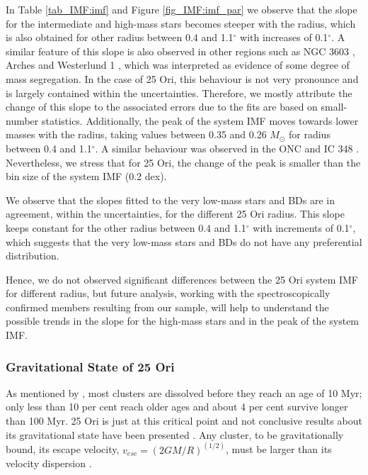 \documentclass[12pt]{article}
\begin{document}
In Table \ref{tab_IMF:imf} and Figure \ref{fig_IMF:imf_par} we observe that the slope for the intermediate and high-mass stars becomes steeper with the radius, which is also obtained for other radius between 0.4 and 1.1$^\circ$ with increases of 0.1$^\circ$. A similar feature of this slope is also observed in other regions such as NGC 3603 \citep{Stolte2006,Harayama2008}, Arches \citep{Habibi2013} and Westerlund 1 \citep{Brandner2008,Andersen2017}, which was interpreted as evidence of some degree of mass segregation. In the case of 25 Ori, this behaviour is not very pronounce and is largely contained within the uncertainties. Therefore, we mostly attribute the change of this slope to the associated errors due to the fits are based on small-number statistics. Additionally, the peak of the system IMF moves towards lower masses with the radius, taking values between 0.35 and 0.26 $M_\odot$ for radius between 0.4 and 1.1$^\circ$. A similar behaviour was observed in the ONC \citep{Hillenbrand2000} and IC 348 \citep{Muench2002}. Nevertheless, we stress that for 25 Ori, the change of the peak is smaller than the bin size of the system IMF (0.2 dex). 

We observe that the slopes fitted to the very low-mass stars and BDs are in agreement, within the uncertainties, for the different 25 Ori radius. This slope keeps constant for the other radius between 0.4 and 1.1$^\circ$ with increments of 0.1$^\circ$, which suggests that the very low-mass stars and BDs do not have any preferential distribution. 

Hence, we do not observed significant differences between the 25 Ori system IMF for different radius, but future analysis, working with the spectroscopically confirmed members resulting from our sample, will help to understand the possible trends in the slope for the high-mass stars and in the peak of the system IMF.

\subsubsection{Gravitational State of 25 Ori}
As mentioned by \citet{Lada-Lada2003}, most clusters are dissolved before they reach an age of 10 Myr; only less than 10 per cent reach older ages and about 4 per cent survive longer than 100 Myr. 25 Ori is just at this critical point and not conclusive results about its gravitational state have been presented \citep{McGehee2006,Downes2014}. Any cluster, to be gravitationally bound, its escape velocity, $v_{esc}=(2GM/R)^{(1/2)}$, must be larger than its velocity dispersion \citep{Sherry2004}.
\end{document}
